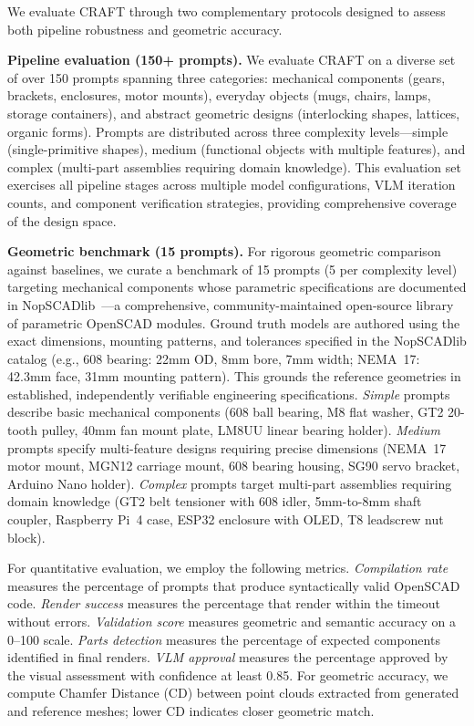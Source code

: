 \documentclass[5p,twocolumn,10pt,times]{elsarticle}
\begin{document}
We evaluate CRAFT through two complementary protocols designed to assess both pipeline robustness and geometric accuracy.

\textbf{Pipeline evaluation (150+ prompts).} We evaluate CRAFT on a diverse set of over 150 prompts spanning three categories: mechanical components (gears, brackets, enclosures, motor mounts), everyday objects (mugs, chairs, lamps, storage containers), and abstract geometric designs (interlocking shapes, lattices, organic forms). Prompts are distributed across three complexity levels---simple (single-primitive shapes), medium (functional objects with multiple features), and complex (multi-part assemblies requiring domain knowledge). This evaluation set exercises all pipeline stages across multiple model configurations, VLM iteration counts, and component verification strategies, providing comprehensive coverage of the design space.

\textbf{Geometric benchmark (15 prompts).} For rigorous geometric comparison against baselines, we curate a benchmark of 15 prompts (5 per complexity level) targeting mechanical components whose parametric specifications are documented in NopSCADlib~\cite{nopscadlib}---a comprehensive, community-maintained open-source library of parametric OpenSCAD modules. Ground truth models are authored using the exact dimensions, mounting patterns, and tolerances specified in the NopSCADlib catalog (e.g., 608 bearing: 22mm OD, 8mm bore, 7mm width; NEMA~17: 42.3mm face, 31mm mounting pattern). This grounds the reference geometries in established, independently verifiable engineering specifications. \textit{Simple} prompts describe basic mechanical components (608 ball bearing, M8 flat washer, GT2 20-tooth pulley, 40mm fan mount plate, LM8UU linear bearing holder). \textit{Medium} prompts specify multi-feature designs requiring precise dimensions (NEMA~17 motor mount, MGN12 carriage mount, 608 bearing housing, SG90 servo bracket, Arduino Nano holder). \textit{Complex} prompts target multi-part assemblies requiring domain knowledge (GT2 belt tensioner with 608 idler, 5mm-to-8mm shaft coupler, Raspberry Pi~4 case, ESP32 enclosure with OLED, T8 leadscrew nut block).

For quantitative evaluation, we employ the following metrics. \textit{Compilation rate} measures the percentage of prompts that produce syntactically valid OpenSCAD code. \textit{Render success} measures the percentage that render within the timeout without errors. \textit{Validation score} measures geometric and semantic accuracy on a 0--100 scale. \textit{Parts detection} measures the percentage of expected components identified in final renders. \textit{VLM approval} measures the percentage approved by the visual assessment with confidence at least 0.85. For geometric accuracy, we compute Chamfer Distance (CD) between point clouds extracted from generated and reference meshes; lower CD indicates closer geometric match.
\end{document}
